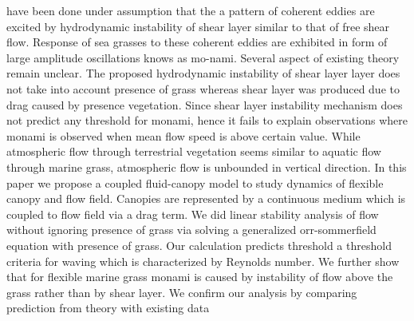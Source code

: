 \documentclass[aps,preprint,floatfix,prl]{revtex4-1}
\begin{document}
have been done under assumption that the a pattern of coherent eddies are excited by hydrodynamic instability of shear layer
similar to that of free shear flow. Response of sea grasses to these coherent eddies are exhibited in form of large amplitude oscillations knows as mo-nami.
Several aspect of existing theory remain unclear. The proposed hydrodynamic instability of shear layer layer does not take into account presence of grass whereas shear layer 
was produced due to drag caused by presence vegetation. Since shear layer instability mechanism does not predict any threshold for monami, hence it fails to explain
observations where monami is observed when mean flow speed is above certain value. While atmospheric flow through terrestrial vegetation seems similar to aquatic flow through marine grass, 
atmospheric flow is unbounded in vertical direction.
\newline     
In this paper we propose a coupled fluid-canopy model to study dynamics of flexible canopy and flow field. Canopies are represented by a continuous 
medium which is coupled to flow field via a drag term. We did linear stability analysis of flow without ignoring presence of grass via solving 
a generalized orr-sommerfield equation with presence of grass. Our calculation predicts threshold a threshold criteria for waving which is characterized by Reynolds number.
We further show that for flexible marine grass monami is caused by instability of flow above the grass rather than by shear layer. We confirm our analysis by comparing 
prediction from theory with existing data
\end{document}
